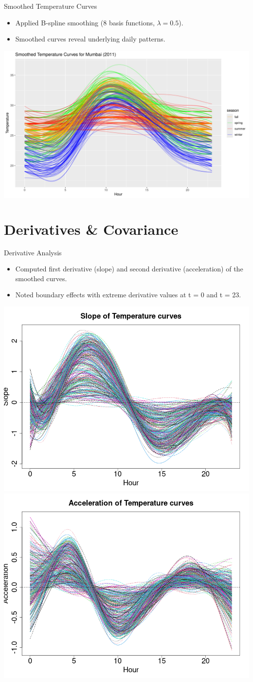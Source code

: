 \documentclass[svgnames, 12pt]{beamer}
\begin{document}
\begin{frame}{Smoothed Temperature Curves}
		\begin{itemize}
		\item Applied B-spline smoothing (8 basis functions, $\lambda=0.5$).
		\item Smoothed curves reveal underlying daily patterns.
	\end{itemize}
	\begin{center}
		\includegraphics[width=0.8\linewidth]{../notebooks/assets/smoothed_temperature_curves.png}
	\end{center}
\end{frame}

\section{Derivatives \& Covariance}

\begin{frame}{Derivative Analysis}
	\begin{itemize}
		\item Computed first derivative (slope) and second derivative (acceleration) of the smoothed curves.
		\item Noted boundary effects with extreme derivative values at t = 0 and t = 23.
		\end{itemize}
	\begin{center}
		\includegraphics[width=0.48\linewidth]{../notebooks/assets/slope_fd_plot.png}\hfill
		\includegraphics[width=0.48\linewidth]{../notebooks/assets/acceleration_fd_plot.png}
	\end{center}
\end{frame}
\end{document}
